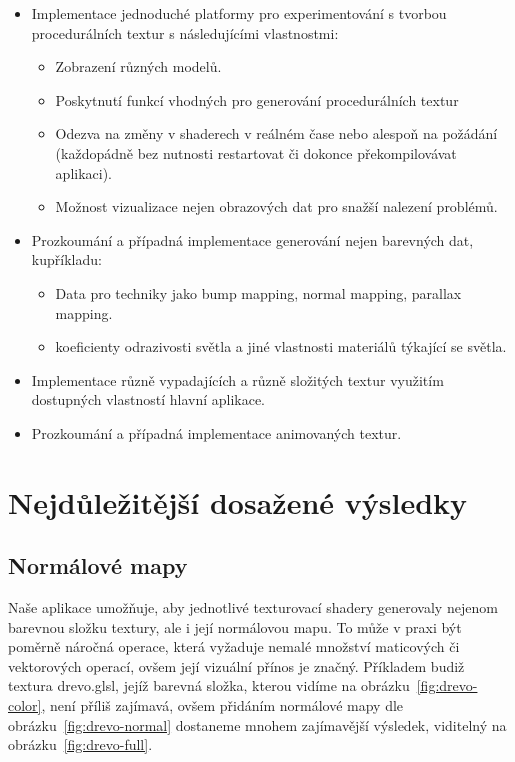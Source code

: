 \documentclass[12pt,a4paper,titlepage,final]{report}
\begin{document}
\begin{itemize}
	\item Implementace jednoduché platformy pro experimentování s tvorbou procedurálních textur s následujícími vlastnostmi:
	\begin{itemize}
		\item Zobrazení různých modelů.
		\item Poskytnutí funkcí vhodných pro generování procedurálních textur
		\item Odezva na změny v shaderech v reálném čase nebo alespoň na požádání (každopádně bez nutnosti restartovat či dokonce překompilovávat aplikaci).
		\item Možnost vizualizace nejen obrazových dat pro snažší nalezení problémů.
	\end{itemize}
	\item Prozkoumání a případná implementace generování nejen barevných dat, kupříkladu:
	\begin{itemize}
		\item Data pro techniky jako bump mapping, normal mapping, parallax mapping.
		\item koeficienty odrazivosti světla a jiné vlastnosti materiálů týkající se světla.
	\end{itemize}
	\item Implementace různě vypadajících a různě složitých textur využitím dostupných vlastností hlavní aplikace.
	\item Prozkoumání a případná implementace animovaných textur.
\end{itemize}

\chapter{Nejdůležitější dosažené výsledky}

\section{Normálové mapy}

Naše aplikace umožňuje, aby jednotlivé texturovací shadery generovaly nejenom barevnou složku textury, ale i její normálovou mapu. To může v praxi být poměrně náročná operace, která vyžaduje nemalé množství maticových či vektorových operací, ovšem její vizuální přínos je značný. Příkladem budiž textura drevo.glsl, jejíž barevná složka, kterou vidíme na obrázku~\ref{fig:drevo-color}, není příliš zajímavá, ovšem přidáním normálové mapy dle obrázku~\ref{fig:drevo-normal} dostaneme mnohem zajímavější výsledek, viditelný na obrázku~\ref{fig:drevo-full}.
\end{document}
